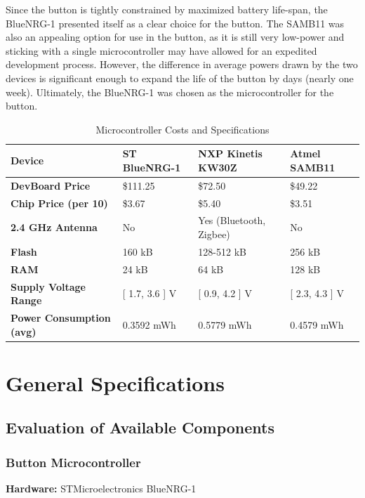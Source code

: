 \documentclass[journal,compsoc]{IEEEtran}
\begin{document}
Since the button is tightly constrained by maximized battery life-span, the BlueNRG-1 presented itself as a clear choice for the button. The SAMB11 was also an appealing option for use in the button, as it is still very low-power and sticking with a single microcontroller may have allowed for an expedited development process. However, the difference in average powers drawn by the two devices is significant enough to expand the life of the button by days (nearly one week). Ultimately, the BlueNRG-1 was chosen as the microcontroller for the button.

\begin{table}[t]
  \centering
  \begin{tabular}{>{\bfseries}l|l l l}
    Device & ST BlueNRG-1 & NXP Kinetis KW30Z & Atmel SAMB11 \\
    \hline
    DevBoard Price & \$111.25 & \$72.50 & \$49.22 \\
    Chip Price (per 10) & \$3.67 & \$5.40 & \$3.51 \\
    2.4 GHz Antenna & No & Yes (Bluetooth, Zigbee) & No \\
    Flash & 160 kB & 128-512 kB & 256 kB \\
    RAM & 24 kB & 64 kB & 128 kB \\
    Supply Voltage Range & [ 1.7, 3.6 ] V & [ 0.9, 4.2 ] V & [ 2.3, 4.3 ] V \\
    Power Consumption (avg) & 0.3592 mWh & 0.5779 mWh & 0.4579 mWh
  \end{tabular}
  \caption{Microcontroller Costs and Specifications}\label{mcuchoice}
\end{table}

\section{General Specifications}

\subsection{Evaluation of Available Components}

\subsubsection{Button Microcontroller}

\textbf {Hardware:} STMicroelectronics BlueNRG-1
\end{document}
